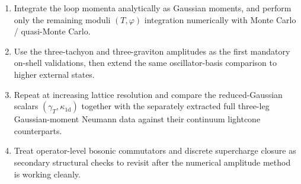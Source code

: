 \documentclass[11pt]{article}
\numberwithin{equation}{section}
\newcommand{\perpD}{D_\perp}
\newcommand{\dd}{\mathrm{d}}
\begin{document}
\begin{enumerate}
\[
I_{\cal D}(T,\varphi)=
\;J_{\mathrm{M}}(T,\varphi;\alpha_{\mathrm{ext}})
\big[\det {\cal M}_{B,\mathrm{osc}}(T,\varphi)\big]^{-\perpD/2}\,
\mathrm{Pf}\!\big(\mathbb A_{F,\mathrm{osc}}(T,\varphi)\big)\,
\widetilde W_{\text{int}}(T,\varphi),
\]
\quad where $J_{\mathrm{M}}$ may be omitted if it has already been absorbed into the chosen definition of the lightcone cell measure $\dd\mu_{\mathrm{lc}}=\prod_e\dd T_e\prod_A\dd\varphi_A$.
\item Integrate the loop momenta analytically as Gaussian moments, and perform only the remaining moduli $(T,\varphi)$ integration numerically with Monte Carlo / quasi-Monte Carlo.
\item Use the three-tachyon and three-graviton amplitudes as the first mandatory on-shell validations, then extend the same oscillator-basis comparison to higher external states.
\item Repeat at increasing lattice resolution and compare the reduced-Gaussian scalars $(\gamma_T,\kappa_{1\mathrm d})$ together with the separately extracted full three-leg Gaussian-moment Neumann data against their continuum lightcone counterparts.
\item Treat operator-level bosonic commutators and discrete supercharge closure as secondary structural checks to revisit after the numerical amplitude method is working cleanly.
\end{enumerate}
\end{document}
